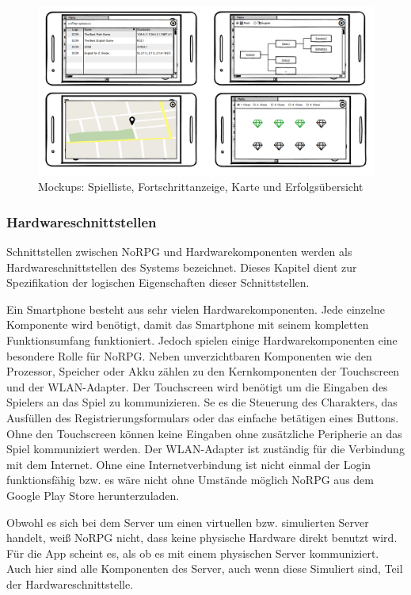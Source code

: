 			\begin{figure}[htbp]
				\centering 
				\label{mockupFenster}
				\includegraphics[width=\textwidth]{pics/NewWindows.png}
				\caption{Mockups: Spielliste, Fortschrittanzeige, Karte und Erfolgsübersicht}
			\end{figure}
		
		\subsubsection{Hardwareschnittstellen}
			Schnittstellen zwischen NoRPG und Hardwarekomponenten werden als Hardwareschnittstellen des Systems bezeichnet. Dieses Kapitel dient zur Spezifikation der logischen Eigenschaften dieser Schnittstellen.
			
			Ein Smartphone besteht aus sehr vielen Hardwarekomponenten. Jede einzelne Komponente wird benötigt, damit das Smartphone mit seinem kompletten Funktionsumfang funktioniert. Jedoch spielen einige Hardwarekomponenten eine besondere Rolle für NoRPG. Neben unverzichtbaren Komponenten wie den Prozessor, Speicher oder Akku zählen zu den Kernkomponenten der Touchscreen und der WLAN-Adapter.	Der Touchscreen wird benötigt um die Eingaben des Spielers an das Spiel zu kommunizieren. Se es die Steuerung des Charakters, das Ausfüllen des Registrierungsformulars oder das einfache betätigen eines Buttons. Ohne den Touchscreen können keine Eingaben ohne zusätzliche Peripherie an das Spiel kommuniziert werden. Der WLAN-Adapter ist zuständig für die Verbindung mit dem Internet. Ohne eine Internetverbindung ist nicht einmal der Login funktionsfähig bzw. es wäre nicht ohne Umstände möglich NoRPG aus dem Google Play Store herunterzuladen.
			
			Obwohl es sich bei dem Server um einen virtuellen bzw. simulierten Server handelt, weiß NoRPG nicht, dass keine physische Hardware direkt benutzt wird. Für die App scheint es, als ob es mit einem physischen Server kommuniziert. Auch hier sind alle Komponenten des Server, auch wenn diese Simuliert sind, Teil der Hardwareschnittstelle.
			
